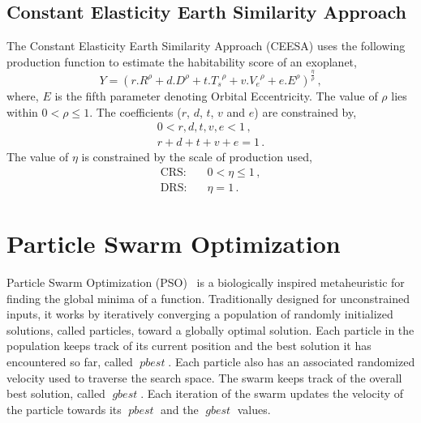 \documentclass[10pt,draft]{article}
\DeclareMathOperator*{\pbest}{\mathit{pbest}}
\DeclareMathOperator*{\gbest}{\mathit{gbest}}
\begin{document}
\subsection{Constant Elasticity Earth Similarity Approach}\label{subsec:ceesa}
The Constant Elasticity Earth Similarity Approach (CEESA) uses the following production function to estimate the
habitability score of an exoplanet,
\begin{equation}\label{eq:ceesa}
  Y = {(r.R^\rho+d.D^\rho+t.{T_s}^\rho+v.{V_e}^\rho+e.E^\rho)}^{\frac{\eta}{\rho}}\,,
\end{equation}
where, $E$ is the fifth parameter denoting Orbital Eccentricity. The value of $\rho$ lies within $0<\rho\leq 1$.
The coefficients ($r$, $d$, $t$, $v$ and $e$) are constrained by,
\begin{subequations}
  \begin{align}
      0 < r,d,t,v,e < 1\,,\\
      r+d+t+v+e = 1\,.
  \end{align}
\end{subequations}
The value of $\eta$ is constrained by the scale of production used,
\begin{subequations}
  \begin{alignat}{3}
    \text{CRS:} & \quad 0 < \eta \leq 1\,,\\
    \text{DRS:} & \quad \eta = 1\,.
  \end{alignat}
\end{subequations}


\section{Particle Swarm Optimization}\label{sec:pso}

Particle Swarm Optimization (PSO)~\cite{PSO1} is a biologically inspired metaheuristic for finding the global minima of
a function.  Traditionally designed for unconstrained inputs, it works by iteratively converging a population of
randomly initialized solutions, called particles, toward a globally optimal solution. Each particle in the population
keeps track of its current position and the best solution it has encountered so far, called $\pbest$. Each particle also
has an associated randomized velocity used to traverse the search space. The swarm keeps track of the overall best
solution, called $\gbest$. Each iteration of the swarm updates the velocity of the particle towards its $\pbest$ and the
$\gbest$ values.
\end{document}

